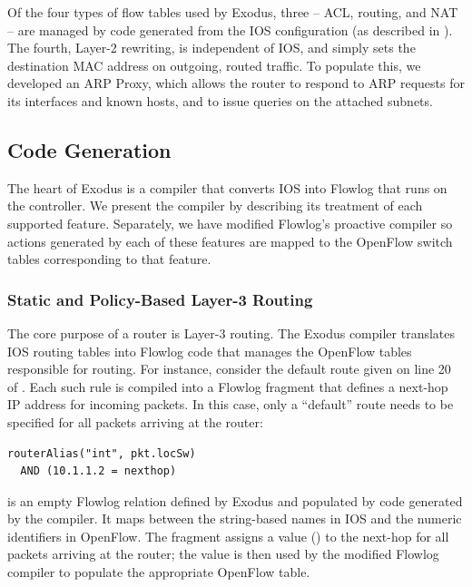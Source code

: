 Of the four types of flow tables used by Exodus, three -- ACL, routing,
and NAT -- are managed by code generated from the IOS configuration (as
described in ). The fourth, Layer-2 rewriting,
is independent of IOS, and simply sets the destination MAC address
on outgoing, routed traffic. To populate this, we developed an
ARP Proxy, which allows the router to respond to ARP requests
for its interfaces and known hosts, and to issue queries on the attached
subnets.

\subsection{Code Generation}
\label{sec:code-gen}

The heart of Exodus is a compiler that converts IOS into Flowlog that
runs on the controller.  We present the compiler by describing its
treatment of each supported feature.  Separately, we have modified
Flowlog's proactive compiler so actions generated by each of
these features are mapped to the OpenFlow switch tables
corresponding to that feature.

\subsubsection{Static and Policy-Based Layer-3 Routing}

The core purpose of a router is Layer-3 routing.
The Exodus compiler translates IOS routing tables into Flowlog code
that manages the OpenFlow tables responsible for routing. For instance,
consider the default route given on line 20 of .
Each such rule is compiled into a Flowlog fragment that defines a next-hop IP
address for incoming packets. In this case, only a ``default'' route
needs to be specified for all packets arriving at the 
router:
\begin{lstlisting}[label=lst:routing-flowlog,language=Flowlog]
routerAlias("int", pkt.locSw) 
  AND (10.1.1.2 = nexthop)
\end{lstlisting}

\noindent
{} is an empty Flowlog relation defined by Exodus and
populated by code generated by the compiler. It maps between the
string-based names in IOS and the numeric identifiers in
OpenFlow. The fragment assigns a value () to the next-hop
for all packets arriving at the  router; the value is then
used by the modified Flowlog compiler to populate the appropriate
OpenFlow table.

